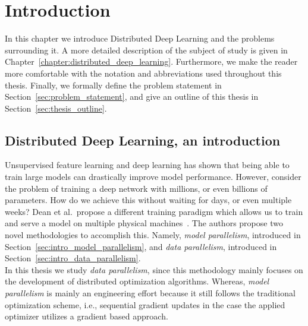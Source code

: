 %
%
%

\chapter{Introduction}
\label{chapter:introduction}

In this chapter we introduce Distributed Deep Learning and the problems surrounding it. A more detailed description of the subject of study is given in Chapter~\ref{chapter:distributed_deep_learning}. Furthermore, we make the reader more comfortable with the notation and abbreviations used throughout this thesis. Finally, we formally define the problem statement in Section~\ref{sec:problem_statement}, and give an outline of this thesis in Section~\ref{sec:thesis_outline}.

\section[Distributed Deep Learning]{Distributed Deep Learning, an introduction}
\label{sec:intro_distributed_deep_learning}

Unsupervised feature learning and deep learning has shown that being able to train large models can drastically improve model performance. However, consider the problem of training a deep network with millions, or even billions of parameters. How do we achieve this without waiting for days, or even multiple weeks? Dean et al.~propose a different training paradigm which allows us to train and serve a model on multiple physical machines~\cite{dean2012large}. The authors propose two novel methodologies to accomplish this. Namely, \emph{model parallelism}, introduced in Section~\ref{sec:intro_model_parallelism}, and \emph{data parallelism}, introduced in Section~\ref{sec:intro_data_parallelism}.\\

In this thesis we study \emph{data parallelism}, since this methodology mainly focuses on the development of distributed optimization algorithms. Whereas, \emph{model parallelism} is mainly an engineering effort because it still follows the traditional optimization scheme, i.e., sequential gradient updates in the case the applied optimizer utilizes a gradient based approach.

